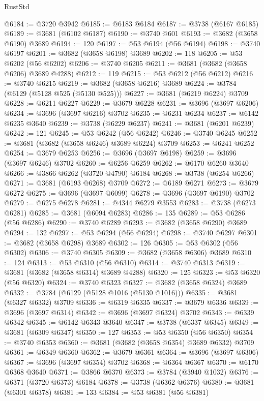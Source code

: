 \begin{lexlean}{RustStd}
\begin{coremodule}
@6184 := @3720 @3942
@6185 := @6183 @6184
@6187 := @3738 (@6167 @6185)
@6189 := @3681 (@6102 @6187)
@6190 := @3740 @601
@6193 := @3682 (@3658 @6190) @3689
@6194 := 120
@6197 := @53 @6194 (@56 @6194)
@6198 := @3740 @6197
@6201 := @3682 (@3658 @6198) @3689
@6202 := 118
@6205 := @53 @6202 (@56 @6202)
@6206 := @3740 @6205
@6211 := @3681 (@3682 (@3658 @6206) @3689 @4288)
@6212 := 119
@6215 := @53 @6212 (@56 @6212)
@6216 := @3740 @6215
@6219 := @3682 (@3658 @6216) @3689
@6224 := @3784 (@6129 (@5128 @525 (@5130 @525)))
@6227 := @3681 (@6219 @6224) @3709
@6228 := @6211 @6227
@6229 := @3679 @6228
@6231 := @3696 (@3697 @6206)
@6234 := @3696 (@3697 @6216) @3702
@6235 := @6231 @6234
@6237 := @6142 @6235 @3640
@6239 := @3738 (@6229 @6237)
@6241 := @3681 (@6201 @6239)
@6242 := 121
@6245 := @53 @6242 (@56 @6242)
@6246 := @3740 @6245
@6252 := @3681 (@3682 (@3658 @6246) @3689 @6224) @3709
@6253 := @6241 @6252
@6254 := @3679 @6253
@6256 := @3696 (@3697 @6198)
@6259 := @3696 (@3697 @6246) @3702
@6260 := @6256 @6259
@6262 := @6170 @6260 @3640
@6266 := @3866 @6262 (@3720 @4790) @6184
@6268 := @3738 (@6254 @6266)
@6271 := @3681 (@6193 @6268) @3709
@6272 := @6189 @6271
@6273 := @3679 @6272
@6275 := @3696 (@3697 @6099)
@6278 := @3696 (@3697 @6190) @3702
@6279 := @6275 @6278
@6281 := @4344 @6279 @3553
@6283 := @3738 (@6273 @6281)
@6285 := @3681 (@6094 @6283)
@6286 := 135
@6289 := @53 @6286 (@56 @6286)
@6290 := @3740 @6289
@6293 := @3682 (@3658 @6290) @3689
@6294 := 132
@6297 := @53 @6294 (@56 @6294)
@6298 := @3740 @6297
@6301 := @3682 (@3658 @6298) @3689
@6302 := 126
@6305 := @53 @6302 (@56 @6302)
@6306 := @3740 @6305
@6309 := @3682 (@3658 @6306) @3689
@6310 := 124
@6313 := @53 @6310 (@56 @6310)
@6314 := @3740 @6313
@6319 := @3681 (@3682 (@3658 @6314) @3689 @4288)
@6320 := 125
@6323 := @53 @6320 (@56 @6320)
@6324 := @3740 @6323
@6327 := @3682 (@3658 @6324) @3689
@6332 := @3784 (@6129 (@5128 @1016 (@5130 @1016)))
@6335 := @3681 (@6327 @6332) @3709
@6336 := @6319 @6335
@6337 := @3679 @6336
@6339 := @3696 (@3697 @6314)
@6342 := @3696 (@3697 @6324) @3702
@6343 := @6339 @6342
@6345 := @6142 @6343 @3640
@6347 := @3738 (@6337 @6345)
@6349 := @3681 (@6309 @6347)
@6350 := 127
@6353 := @53 @6350 (@56 @6350)
@6354 := @3740 @6353
@6360 := @3681 (@3682 (@3658 @6354) @3689 @6332) @3709
@6361 := @6349 @6360
@6362 := @3679 @6361
@6364 := @3696 (@3697 @6306)
@6367 := @3696 (@3697 @6354) @3702
@6368 := @6364 @6367
@6370 := @6170 @6368 @3640
@6371 := @3866 @6370
@6373 := @3784 (@3940 @1032)
@6376 := @6371 (@3720 @6373) @6184
@6378 := @3738 (@6362 @6376)
@6380 := @3681 (@6301 @6378)
@6381 := 133
@6384 := @53 @6381 (@56 @6381)

\end{coremodule}
\end{lexlean}
